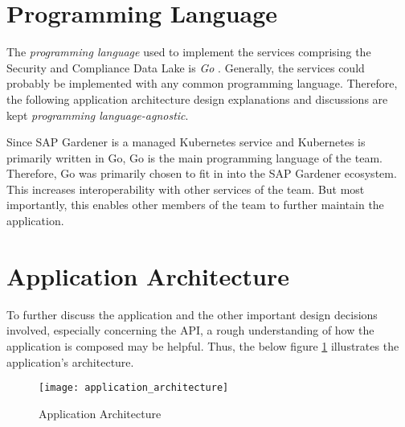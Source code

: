 \section{Programming Language}
The \emph{programming language} used to implement the services comprising the Security and Compliance Data Lake is \emph{Go} \cite{Golang}. Generally, the services could probably be implemented with any common programming language. %
Therefore, the following application architecture design explanations and discussions are kept \emph{programming language-agnostic}.\par 
Since SAP Gardener is a managed Kubernetes service and Kubernetes is primarily written in Go, Go is the main programming language of the team. Therefore, Go was primarily chosen to fit in into the SAP Gardener ecosystem. This increases interoperability with other services of the team. But most importantly, this enables other members of the team to further maintain the application. 

\section{Application Architecture}
To further discuss the application and the other important design decisions involved, especially concerning the API, a rough understanding of how the application is composed may be helpful. Thus, the below figure \ref{fig:ApplicationArchitecture} illustrates the application's architecture. 

\begin{figure}[H]
	\centering
	\texttt{[image: application\_architecture]}
	\caption[Application Architecture]{Application Architecture }
	\label{fig:ApplicationArchitecture}
\end{figure}


